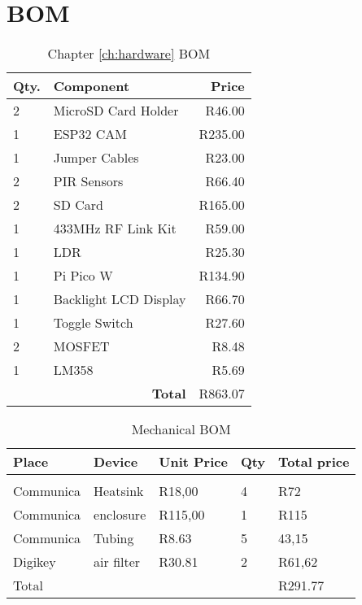 \documentclass[class=report,11pt,crop=false]{standalone}
\begin{document}
\ifstandalone
\tableofcontents
\fi


\chapter{BOM}

\begin{table}[h]
\centering
\begin{tabular}{|l|l|r|}
\hline
\textbf{Qty.} & \textbf{Component} & \textbf{Price} \\
\hline
2 & MicroSD Card Holder & R46.00 \\
1 & ESP32 CAM & R235.00 \\
1 & Jumper Cables & R23.00 \\
2 & PIR Sensors & R66.40 \\
2 & SD Card & R165.00 \\
1 & 433MHz RF Link Kit & R59.00 \\
1 & LDR & R25.30 \\
1 & Pi Pico W & R134.90 \\
1 & Backlight LCD Display & R66.70 \\
1 & Toggle Switch & R27.60 \\
2 & MOSFET & R8.48 \\
1 & LM358 & R5.69 \\
\hline
\multicolumn{2}{|r|}{\textbf{Total}} & R863.07 \\
\hline
\end{tabular}
\caption{Chapter \ref{ch:hardware} BOM}
\label{tab:HW_BOM}
\end{table}



\begin{table}
\centering

\begin{tabular}{|l |l |l |l |l|} \hline 
Place & Device & Unit Price & Qty & Total price \\ \hline 
 &  &  &  &  \\ \hline 
Communica & Heatsink & R18,00 & 4 & R72 \\ \hline 
Communica & enclosure & R115,00 & 1 & R115 \\ \hline 
Communica & Tubing & R8.63 & 5 & 43,15 \\ \hline 
Digikey & air filter & R30.81 & 2 & R61,62 \\ \hline 
Total &  &  &  & R291.77 \\ \hline

\end{tabular}
\caption{Mechanical BOM }
\label{tab: Mechanical BOM (Online)}
\end{table}
\end{document}
